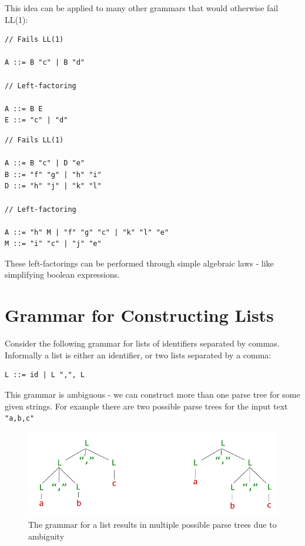 \documentclass[
]{book}
\begin{document}
This idea can be applied to many other grammars that would otherwise fail LL(1):

\begin{verbatim}
// Fails LL(1)

A ::= B "c" | B "d"

// Left-factoring

A ::= B E
E ::= "c" | "d"
\end{verbatim}

\begin{verbatim}
// Fails LL(1)

A ::= B "c" | D "e"
B ::= "f" "g" | "h" "i"
D ::= "h" "j" | "k" "l"

// Left-factoring

A ::= "h" M | "f" "g" "c" | "k" "l" "e"
M ::= "i" "c" | "j" "e"
\end{verbatim}

These left-factorings can be performed through simple algebraic laws - like simplifying boolean expressions.

\hypertarget{grammar-for-constructing-lists}{%
\section{Grammar for Constructing Lists}\label{grammar-for-constructing-lists}}

Consider the following grammar for lists of identifiers separated by commas. Informally a list is either an identifier, or two lists separated by a comma:

\begin{verbatim}
L ::= id | L ",", L
\end{verbatim}

This grammar is {ambiguous} - we can construct more than one parse tree for some given strings. For example there are two possible parse trees for the input text \texttt{"a,b,c"}

\begin{figure}
\includegraphics{img/09-image11} \caption{The grammar for a list results in multiple possible parse trees due to ambiguity}\label{fig:ambigous}
\end{figure}
\end{document}
